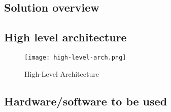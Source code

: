 \documentclass[../main.tex]{subfiles}
\begin{document}
\subsection{Solution overview}




\subsection{High level architecture}

\begin{figure}[H]
	\centering
	\texttt{[image: high-level-arch.png]}
	\caption{High-Level Architecture}\label{fig:arch-fig}
\end{figure}


\subsection{Hardware/software to be used}
\end{document}

